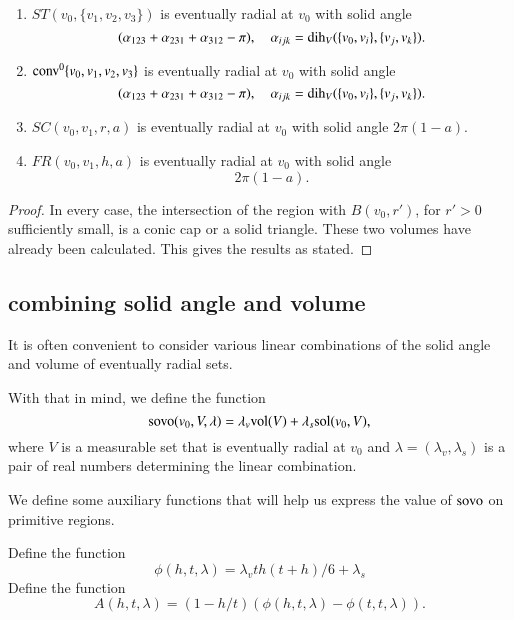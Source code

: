 \begin{lemma} 
\begin{enumerate}
    \item  $ST(v_0,\{v_1,v_2,v_3\})$ is eventually radial at $v_0$
     with solid angle 
     $$
     (\alpha_{123}+\alpha_{231}+\alpha_{312}-\pi),\quad
     \alpha_{ijk}=\operatorname{dih}_V(\{v_0,v_i\},\{v_j,v_k\}).
     $$
    \item ${\operatorname{conv}}^0\{v_0,v_1,v_2,v_3\}$ is eventually radial at $v_0$
      with solid angle
           $$
     (\alpha_{123}+\alpha_{231}+\alpha_{312}-\pi),\quad
     \alpha_{ijk}=\operatorname{dih}_V(\{v_0,v_i\},\{v_j,v_k\}).
     $$
    \item $SC(v_0,v_1,r,a)$ is eventually radial at $v_0$ with solid
      angle 
      $2\pi(1-a)$.
    \item $FR(v_0,v_1,h,a)$ is eventually radial at $v_0$ with solid
      angle
        $$
        2\pi (1-a).
        $$
\end{enumerate}
\end{lemma}

\begin{proof} In every case, the intersection of 
  the region with $B(v_0,r')$, for $r'>0$ sufficiently small, is
  a conic cap or a solid triangle.  These two volumes have
  already been calculated.  This gives the results as stated.
\end{proof}

\subsection{combining solid angle and volume}

It is often convenient to consider various linear combinations
of the solid angle and volume of eventually radial sets.  

\begin{definition}\label{def:sovo}
With
that in mind, we define the function
  $$
  {\operatorname{sovo}}(v_0,V,\lambda) = \lambda_v {\operatorname{vol}}(V) + \lambda_s
  {\operatorname{sol}}(v_0,V),
  $$
where $V$ is a measurable set that is eventually radial at $v_0$
and $\lambda=(\lambda_v,\lambda_s)$ is a pair of real numbers
determining the linear combination.
\end{definition}

We define some auxiliary functions that will help us express
the value of ${\operatorname{sovo}}$ on primitive regions.

\begin{definition}
Define the function
 $$
 \phi(h,t,\lambda)=
   \lambda_v  t h (t+h)/6 + \lambda_s 
 $$
Define the function
 $$A(h,t,\lambda) = (1-h/t) (\phi(h,t,\lambda) - \phi(t,t,\lambda)).$$
\end{definition}

